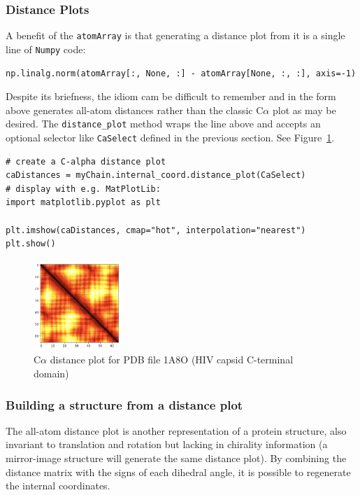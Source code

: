 \subsubsection{Distance Plots}

A benefit of the \texttt{atomArray} is that generating a distance plot from it
is a single line of \texttt{Numpy} code:

\begin{verbatim}
np.linalg.norm(atomArray[:, None, :] - atomArray[None, :, :], axis=-1)
\end{verbatim}

Despite its briefness, the idiom cam be difficult to remember and in the form
above generates all-atom distances rather than the classic C$\alpha$ plot
as may be desired.  The \texttt{distance\_plot\(\)} method wraps the line above
and accepts an optional selector like \texttt{CaSelect} defined in the previous
section.  See Figure~\ref{fig:distanceplot}.

\begin{verbatim}
# create a C-alpha distance plot
caDistances = myChain.internal_coord.distance_plot(CaSelect)
# display with e.g. MatPlotLib:
import matplotlib.pyplot as plt

plt.imshow(caDistances, cmap="hot", interpolation="nearest")
plt.show()
\end{verbatim}

\begin{figure}[h!]
\includegraphics[width=0.3\textwidth]{images/1a8o-ca-plot.png}
\caption{C$\alpha$ distance plot for PDB file 1A8O (HIV capsid C-terminal domain)}
\label{fig:distanceplot}
\end{figure}

\subsubsection{Building a structure from a distance plot}

The all-atom distance plot is another representation of a protein structure, also
invariant to translation and rotation but lacking in chirality information (a
mirror-image structure will generate the same distance plot).  By combining the
distance matrix with the signs of each dihedral angle, it is possible to regenerate
the internal coordinates.

